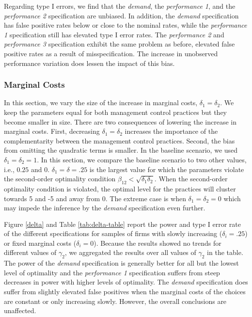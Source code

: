 \documentclass[12pt]{article}
\begin{document}
Regarding type I errors, we find that the \emph{demand}, the \emph{performance 1}, and the \emph{performance 2} specification are unbiased. In addition, the \emph{demand} specification has false positive rates below or close to the nominal rates, while the \emph{performance 1} specification still has elevated type I error rates. The \emph{performance 2} and \emph{performance 3} specification exhibit the same problem as before, elevated false positive rates as a result of misspecification. The increase in unobserved performance variation does lessen the impact of this bias. 

\subsubsection{Marginal Costs}\label{marginal-cost}
 
In this section, we vary the size of the increase in marginal costs, $\delta_1 = \delta_2$. We keep the parameters equal for both management control practices but they become smaller in size. There are two consequences of lowering the increase in marginal costs. First, decreasing $\delta_1 = \delta_2$ increases the importance of the complementarity between the management control practices. Second, the bias from omitting the quadratic terms is smaller. In the baseline scenario, we used $\delta_1 = \delta_2 = 1$. In this section, we compare the baseline scenario to two other values, i.e., $0.25$ and $0$. $\delta_1 = \delta = .25$ is the largest value for which the parameters violate the second-order optimality condition $\beta_{12} < \sqrt{\delta_1 \delta_2}$. When the second-order optimality condition is violated, the optimal level for the practices will cluster towards 5 and -5 and away from  0. The extreme case is when $\delta_1 = \delta_2 = 0$ which may impede the inference by the \emph{demand} specification even further. 

Figure \ref{delta} and Table \ref{tab:delta-table} report the power and type I error rate of the different specifications for samples of firms with slowly increasing ($\delta_i = .25$) or fixed marginal costs ($\delta_i = 0$). Because the results showed no trends for different values of $\gamma_2$, we aggregated the results over all values of $\gamma_2$ in the table. The power of the \emph{demand} specification is generally better for all but the lowest level of optimality and the \emph{performance 1} specification suffers from steep decreases in power with higher levels of optimality. The \emph{demand} specification does suffer from slightly elevated false positives when the marginal costs of the choices are constant or only increasing slowly. However, the overall conclusions are unaffected.
\end{document}
